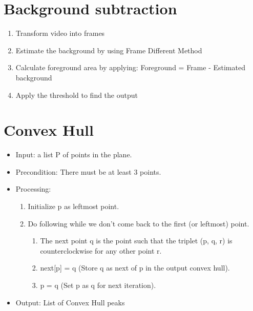 \documentclass{scrreprt}
\begin{document}
\section{Background subtraction}
\begin{enumerate}
    \item Transform video into frames
    \item Estimate the background by using Frame Different Method
    \item Calculate foreground area by applying: Foreground = Frame - Estimated background
    \item Apply the threshold to find the output
\end{enumerate}
\section{Convex Hull}
\begin{itemize}
    \item Input: a list P of points in the plane.
    \item Precondition: There must be at least 3 points.
    \item Processing:
    \begin{enumerate}
        \item Initialize p as leftmost point.
        \item Do following while we don’t come back to the first (or leftmost) point.
        \begin{enumerate}
            \item The next point q is the point such that the triplet (p, q, r) is counterclockwise for any other point r.
            \item next[p] = q (Store q as next of p in the output convex hull).
            \item p = q (Set p as q for next iteration).
        \end{enumerate}
    \end{enumerate}
    \item Output: List of Convex Hull peaks
\end{itemize}
\end{document}
